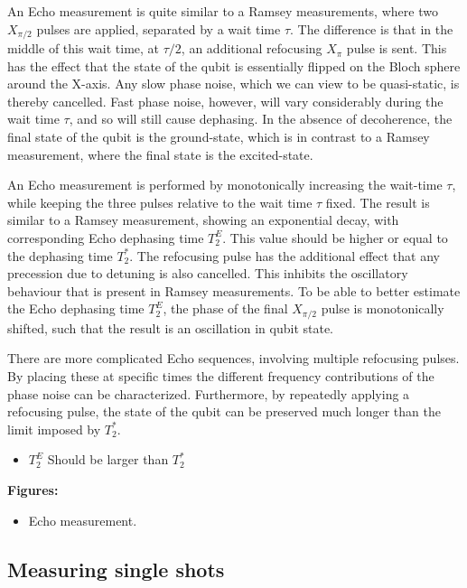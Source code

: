           An Echo measurement is quite similar to a Ramsey measurements, where two $X_{\pi/2}$ pulses are applied, separated by a wait time $\tau$. The difference is that in the middle of this wait time, at $\tau/2$, an additional refocusing $X_{\pi}$ pulse is sent. This has the effect that the state of the qubit is essentially flipped on the Bloch sphere around the X-axis. Any slow phase noise, which we can view to be quasi-static, is thereby cancelled. Fast phase noise, however, will vary considerably during the wait time $\tau$, and so will still cause dephasing. In the absence of decoherence, the final state of the qubit is the ground-state, which is in contrast to a Ramsey measurement, where the final state is the excited-state.

          An Echo measurement is performed by monotonically increasing the wait-time $\tau$, while keeping the three pulses relative to the wait time $\tau$ fixed. The result is similar to a Ramsey measurement, showing an exponential decay, with corresponding Echo dephasing time $T_2^E$. This value should be higher or equal to the dephasing time $T_2^*$. The refocusing pulse has the additional effect that any precession due to detuning is also cancelled. This inhibits the oscillatory behaviour that is present in Ramsey measurements. To be able to better estimate the Echo dephasing time $T_2^E$, the phase of the final $X_{\pi/2}$ pulse is monotonically shifted, such that the result is an oscillation in qubit state.

          There are more complicated Echo sequences, involving multiple refocusing pulses. By placing these at specific times the different frequency contributions of the phase noise can be characterized. Furthermore, by repeatedly applying a refocusing pulse, the state of the qubit can be preserved much longer than the limit imposed by $T_2^*$.


          \begin{itemize}
            \item $T_2^E$ Should be larger than $T_2^*$
          \end{itemize}

          \textbf{Figures:}
          \begin{itemize}
            \item Echo measurement.
          \end{itemize}

      \subsection{Measuring single shots}

